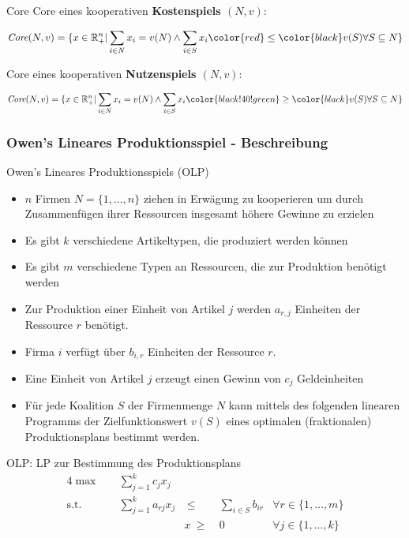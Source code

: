 \documentclass{panikzettel}
\begin{document}
{\begin{defi}{Core}
	Core eines kooperativen \textbf{\color{red} Kostenspiels $(N,v)$}:
	
	\[ \textit{Core}(N,v) = \{x \in \mathbb{R}_+^n | \sum_{i \in N} x_i = v(N) \land \sum_{i \in S} x_i \color{red} \leq \color{black} v(S) \forall S \subseteq N \} \]
	
	Core eines kooperativen \textbf{\color{black!40!green} Nutzenspiels $(N,v)$}:
	
	\[ \textit{Core}(N,v) = \{x \in \mathbb{R}_+^n | \sum_{i \in N} x_i = v(N) \land \sum_{i \in S} x_i \color{black!40!green} \geq \color{black} v(S) \forall S \subseteq N \} \]
	
\end{defi}

\subsubsection{Owen's Lineares Produktionsspiel - Beschreibung}

\begin{defi}{Owen's Lineares Produktionsspiels (OLP)}
	\begin{itemize}
		\item $n$ Firmen $N = \{1, \dots, n \}$ ziehen in Erwägung zu kooperieren um durch Zusammenfügen ihrer Ressourcen insgesamt höhere Gewinne zu erzielen
		\item Es gibt $k$ verschiedene Artikeltypen, die produziert werden können
		\item Es gibt $m$ verschiedene Typen an Ressourcen, die zur Produktion benötigt werden
		\item Zur Produktion einer Einheit von Artikel $j$ werden $a_{r,j}$ Einheiten der Ressource $r$ benötigt.
		\item Firma $i$ verfügt über $b_{i,r}$ Einheiten der Ressource $r$.
		\item Eine Einheit von Artikel $j$ erzeugt einen Gewinn von $c_j$ Geldeinheiten
		\item Für jede Koalition $S$ der Firmenmenge $N$ kann mittels des folgenden linearen Programms der Zielfunktionswert $v(S)$ eines optimalen (fraktionalen) Produktionsplans bestimmt werden.
	\end{itemize}
\end{defi}

\begin{defi}{OLP: LP zur Bestimmung des Produktionsplans}
	\begin{alignat*}{4}
		\max \quad & \sum_{j=1}^{k} c_j x_j \\
		\text{s.t.} \quad & \sum_{j=1}^{k} a_{rj} x_j& ~\leq~ & \sum_{i \in S} b_{ir} & \forall r \in \{1, \dots, m\}  \\
		& & x  ~\geq~ & 0 & \forall j \in \{1, \dots, k\}
	\end{alignat*}
\end{defi}

}
\end{document}
